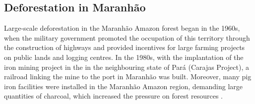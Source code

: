 
\subsection{Deforestation in Maranhão}


Large-scale deforestation in the Maranhão Amazon forest began in the 1960s, when the military government promoted the occupation of this territory through the construction of highways and provided incentives for large farming projects on public lands and logging centres. In the 1980s, with the implantation of the iron mining project in the in the neighbouring state of Pará (Carajas Project), a railroad linking the mine to the port in Maranhão was built. Moreover, many pig iron facilities were installed in the Maranhão Amazon region, demanding large quantities of charcoal, which increased the pressure on forest resources \citep{CELENTANO_2017}.


